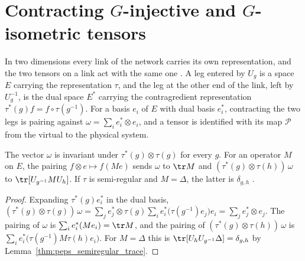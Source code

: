\section{Contracting \texorpdfstring{$G$}{G}-injective and \texorpdfstring{$G$}{G}-isometric tensors}%
\label{sec:peps_g_injective_contraction}

In two dimensions every link of the network carries its own representation,
and the two tensors on a link act with the same one
\cite[Section~``Two dimensions: $G$-injective PEPS'']{Schuch2010PEPS}. A
leg entered by $U_g$ is a space $E$ carrying the representation $\tau$, and
the leg at the other end of the link, left by $U_g^{-1}$, is the dual space
$E^*$ carrying the contragredient representation
$\tau^*(g)f=f\circ\tau(g^{-1})$. For a basis $e_i$ of $E$ with dual basis
$e_i^*$, contracting the two legs is pairing against
$\omega=\sum_ie_i^*\otimes e_i$, and a tensor is identified with its map
$\mathcal{P}$ from the virtual to the physical system.

\begin{lemma}%
    \label{lem:peps_link_contraction}
    \leanok
    The vector $\omega$ is invariant under $\tau^*(g)\otimes\tau(g)$ for every
    $g$. For an operator $M$ on $E$, the pairing $f\otimes e\mapsto f(Me)$
    sends $\omega$ to $\tr M$ and $(\tau^*(g)\otimes\tau(h))\,\omega$ to
    $\tr[U_{g^{-1}}MU_h]$. If $\tau$ is semi-regular and $M=\Delta$, the
    latter is $\delta_{g,h}$
    \cite[Section~``Two dimensions: $G$-injective PEPS'']{Schuch2010PEPS}.
\end{lemma}

\begin{proof}\leanok
    Expanding $\tau^*(g)e_i^*$ in the dual basis,
    $(\tau^*(g)\otimes\tau(g))\,\omega
        =\sum_j e_j^*\otimes\tau(g)\sum_ie_i^*\big(\tau(g^{-1})e_j\big)e_i
        =\sum_je_j^*\otimes e_j$. The pairing of $\omega$ is
    $\sum_ie_i^*(Me_i)=\tr M$, and the pairing of
    $(\tau^*(g)\otimes\tau(h))\,\omega$ is
    $\sum_ie_i^*\big(\tau(g^{-1})M\tau(h)e_i\big)$. For $M=\Delta$ this is
    $\tr[U_hU_{g^{-1}}\Delta]=\delta_{g,h}$ by
    Lemma~\ref{thm:peps_semiregular_trace}.
\end{proof}

